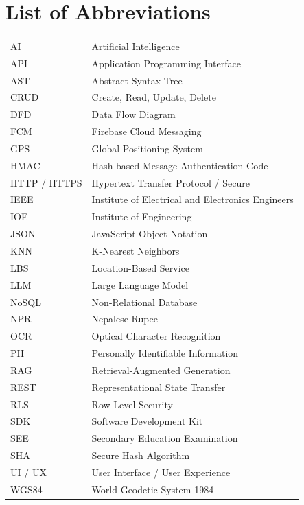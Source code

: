 \documentclass[12pt]{report}
\begin{document}
\newpage
\tableofcontents

\newpage
{}
\listoffigures

\newpage
{}
\listoftables

\newpage
\chapter*{List of Abbreviations}
\begin{longtable}{p{} p{}}
AI & Artificial Intelligence \\
API & Application Programming Interface \\
AST & Abstract Syntax Tree \\
CRUD & Create, Read, Update, Delete \\
DFD & Data Flow Diagram \\
FCM & Firebase Cloud Messaging \\
GPS & Global Positioning System \\
HMAC & Hash-based Message Authentication Code \\
HTTP / HTTPS & Hypertext Transfer Protocol / Secure \\
IEEE & Institute of Electrical and Electronics Engineers \\
IOE & Institute of Engineering \\
JSON & JavaScript Object Notation \\
KNN & K-Nearest Neighbors \\

LBS & Location-Based Service \\
LLM & Large Language Model \\
NoSQL & Non-Relational Database \\
NPR & Nepalese Rupee \\
OCR & Optical Character Recognition \\
PII & Personally Identifiable Information \\
RAG & Retrieval-Augmented Generation \\
REST & Representational State Transfer \\
RLS & Row Level Security \\
SDK & Software Development Kit \\
SEE & Secondary Education Examination \\
SHA & Secure Hash Algorithm \\
UI / UX & User Interface / User Experience \\
WGS84 & World Geodetic System 1984 \\
\end{longtable}
\end{document}
